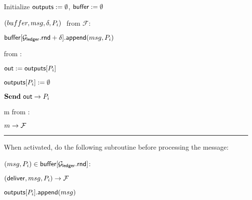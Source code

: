 \begin{bbox}[title={Wrapper $\mathcal{W} (\mathcal{F},\mathcal{C}_1,...,\mathcal{C}_k)$}]

Initialize ${\mathsf {outputs}} := \emptyset$, ${\mathsf {buffer}} := \emptyset$

\OnInput $\inmsg{buffer}{msg}{\delta}{P_i}$ from $\mathcal{F}$:
	
	\quad ${\mathsf {buffer}}[\mathcal{G}_{{\mathsf {ledger}}}.{\mathsf {rnd}}+\delta].{\mathsf {append}}(msg,P_i)$ 

\OnInput {} from \Partyi:

	\quad ${\mathsf {out}} := {\mathsf {outputs}}[P_i]$

	\quad ${\mathsf {outputs}}[P_i] := \emptyset$

	\quad $\textbf{Send}~ {\mathsf {out}} \rightarrow P_i$

\Allinputs m from \Partyi:

	\quad \Send $m \rightarrow \mathcal{F}$

\vspace{2mm} \hrule \vspace{2mm}

When activated, do the following subroutine before processing the message:

	\quad \For $(msg,P_i) \in {\mathsf {buffer}}[\mathcal{G}_{{\mathsf {ledger}}}.{\mathsf {rnd}}]$:

		\qquad \Send $({\mathsf {deliver}},msg,P_i) \rightarrow \mathcal{F}$

		\qquad ${\mathsf {outputs}}[P_i].{\mathsf {append}}(msg)$

\end{bbox}
